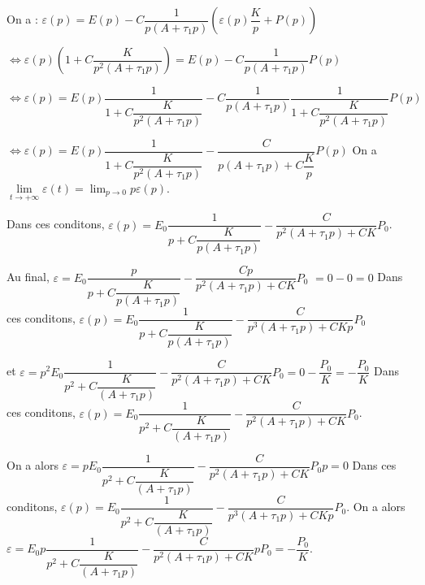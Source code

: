 \begin{corrigebox}
On a : 
$\varepsilon(p) = E(p)-C\dfrac{1}{p\left( A+\tau_1 p \right)} \left( \varepsilon(p)\dfrac{K}{p} + P(p)\right)$

$\Leftrightarrow \varepsilon(p) \left(1 +C\dfrac{K}{p^2\left( A+\tau_1 p \right)}\right) = E(p)-C\dfrac{1}{p\left( A+\tau_1 p \right)}  P(p)$

$\Leftrightarrow \varepsilon(p) = E(p)\dfrac{1}{1 +C\dfrac{K}{p^2\left( A+\tau_1 p \right)}}-C\dfrac{1}{p\left( A+\tau_1 p \right)} \dfrac{1}{1 +C\dfrac{K}{p^2\left( A+\tau_1 p \right)}} P(p)$

$\Leftrightarrow \varepsilon(p) = E(p)\dfrac{1}{1 +C\dfrac{K}{p^2\left( A+\tau_1 p \right)}}-\dfrac{C}{p\left( A+\tau_1 p \right) +C\dfrac{K}{p}} P(p)$
On a $\lim\limits_{t\to +\infty} \varepsilon(t) = \lim_{p\to 0} p\varepsilon(p)$.

Dans ces conditons, 
$\varepsilon(p) = E_0\dfrac{1}{p +C\dfrac{K}{p\left( A+\tau_1 p \right)}}-\dfrac{C}{p^2\left( A+\tau_1 p \right) +CK} P_0$.

Au final, $\varepsilon = E_0\dfrac{p}{p +C\dfrac{K}{p\left( A+\tau_1 p \right)}}-\dfrac{Cp}{p^2\left( A+\tau_1 p \right) +CK} P_0$ $=0-0 =0$
Dans ces conditons, 
$\varepsilon(p) = E_0\dfrac{1}{p +C\dfrac{K}{p\left( A+\tau_1 p \right)}}-\dfrac{C}{p^3\left( A+\tau_1 p \right) +CKp} P_0$

et  $\varepsilon = p^2E_0\dfrac{1}{p^2 +C\dfrac{K}{\left( A+\tau_1 p \right)}}-\dfrac{C}{p^2\left( A+\tau_1 p \right) +CK} P_0 = 0 - \dfrac{P_0}{K}=- \dfrac{P_0}{K}$
Dans ces conditons, 
$\varepsilon(p) = E_0\dfrac{1}{p^2 +C\dfrac{K}{\left( A+\tau_1 p \right)}}-\dfrac{C}{p^2\left( A+\tau_1 p \right) +CK} P_0$.

On a alors $\varepsilon = pE_0\dfrac{1}{p^2 +C\dfrac{K}{\left( A+\tau_1 p \right)}}-\dfrac{C}{p^2\left( A+\tau_1 p \right) +CK} P_0p = 0$
Dans ces conditons, 
$\varepsilon(p) = E_0\dfrac{1}{p^2 +C\dfrac{K}{\left( A+\tau_1 p \right)}}-\dfrac{C}{p^3\left( A+\tau_1 p \right) +CKp} P_0$. 
On a alors
$\varepsilon = E_0 p \dfrac{1}{p^2 +C\dfrac{K}{\left( A+\tau_1 p \right)}}-\dfrac{C}{p^2\left( A+\tau_1 p \right) +CK} p P_0 = -\dfrac{P_0}{K} $.
\end{corrigebox}
